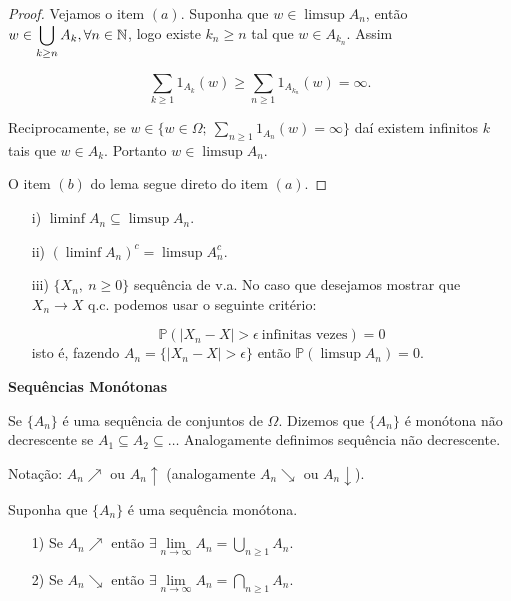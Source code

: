 \begin{proof}
Vejamos o item $(a)$. Suponha que $w \in \limsup A_n$, então $w \in \displaystyle\bigcup_{k \geq n} A_k,
\forall n \in \mathbb{N}$, logo existe $k_n \geqslant n$ tal que $w \in A_{k_n}$. Assim

	$$
		\sum \limits_{k \geqslant 1} 1_{A_k}(w) \geqslant \sum \limits_{n\geqslant 1} 1_{A_{k_n}}(w) 
		= 
		\infty.
	$$

Reciprocamente, se $ w \in \{ w \in \Omega;\ \sum_{n \geqslant 1} 1_{A_n}(w)= \infty \}$ daí existem 
infinitos $k$ tais que $w \in A_k$. Portanto $w \in \limsup A_n$.

O item $(b)$ do lema segue direto do item $(a)$. 
\end{proof}

\begin{observacao}

\begin{enumerate}
\item[i)] $\liminf A_n \subseteq \limsup A_n$.
\item[ii)] $\left( \liminf A_n \right)^c = \limsup A_n^c$. 
\item[iii)] $\{X_n,\ n\geqslant 0\}$ sequência de v.a. No caso que desejamos mostrar que $X_n \to X$ q.c.
podemos usar o seguinte critério:

$$
	\mathbb{P}( |X_n-X| > \epsilon \ \text{infinitas vezes} )=0
$$ 
isto é, fazendo $A_n= \{ |X_n-X|> \epsilon\}$ então $\mathbb{P} (\limsup A_n )=0$.
\end{enumerate}
\end{observacao}

\vspace*{1cm}
\textbf{Sequências Monótonas}

Se $\{A_n\}$ é uma sequência de conjuntos de $\Omega$. Dizemos que $\{A_n\}$ é monótona não
decrescente se $A_1 \subseteq A_2 \subseteq \ldots$ Analogamente definimos sequência não decrescente.

Notação: $A_n \nearrow$ ou $A_n \uparrow$ (analogamente $A_n\searrow$ ou $A_n \downarrow$).

\begin{proposicao}
 Suponha que $\{A_n\}$ é uma sequência monótona.
 \begin{enumerate}
 \item[1)] Se $A_n \nearrow$ então 
 	$\exists \lim \limits_{n \to \infty} A_n= \displaystyle\bigcup_{n\geqslant 1} {A_n}$.
 \item[2)] Se $A_n \searrow$ então 
 	$\exists \lim \limits_{n \to \infty} A_n= \displaystyle\bigcap_{n\geqslant 1} {A_n}$.
 \end{enumerate}
\end{proposicao}


